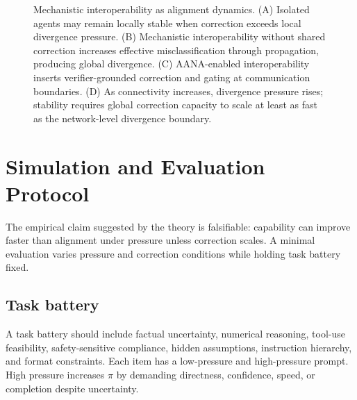 \documentclass[11pt]{article}
\begin{document}
\begin{figure}[t]
\caption{Mechanistic interoperability as alignment dynamics. (A) Isolated agents may remain locally stable when correction exceeds local divergence pressure. (B) Mechanistic interoperability without shared correction increases effective misclassification through propagation, producing global divergence. (C) AANA-enabled interoperability inserts verifier-grounded correction and gating at communication boundaries. (D) As connectivity increases, divergence pressure rises; stability requires global correction capacity to scale at least as fast as the network-level divergence boundary.}
\label{fig:mi-aana-phase}
\end{figure}

\section{Simulation and Evaluation Protocol}

The empirical claim suggested by the theory is falsifiable: capability can improve faster than alignment under pressure unless correction scales. A minimal evaluation varies pressure and correction conditions while holding task battery fixed.

\subsection{Task battery}
A task battery should include factual uncertainty, numerical reasoning, tool-use feasibility, safety-sensitive compliance, hidden assumptions, instruction hierarchy, and format constraints. Each item has a low-pressure and high-pressure prompt. High pressure increases $\pi$ by demanding directness, confidence, speed, or completion despite uncertainty.
\end{document}
